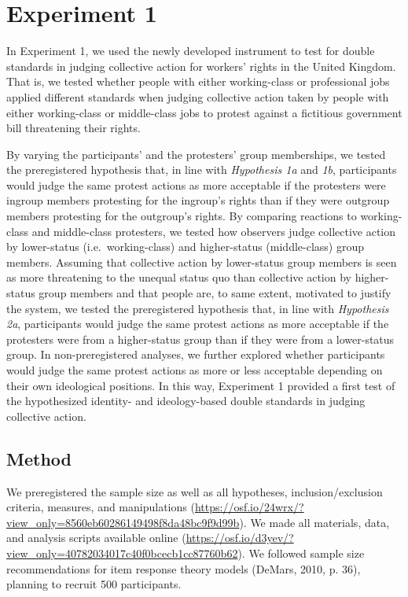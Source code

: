 \documentclass[twocolumn, 11pt, letterpaper]{article}
\begin{document}
\hypertarget{experiment-1}{%
\section{Experiment 1}\label{experiment-1}}

In Experiment 1, we used the newly developed instrument to test for
double standards in judging collective action for workers' rights in the
United Kingdom. That is, we tested whether people with either
working-class or professional jobs applied different standards when
judging collective action taken by people with either working-class or
middle-class jobs to protest against a fictitious government bill
threatening their rights.

By varying the participants' and the protesters' group memberships, we
tested the preregistered hypothesis that, in line with \emph{Hypothesis
1a} and \emph{1b}, participants would judge the same protest actions as
more acceptable if the protesters were ingroup members protesting for
the ingroup's rights than if they were outgroup members protesting for
the outgroup's rights. By comparing reactions to working-class and
middle-class protesters, we tested how observers judge collective action
by lower-status (i.e.~working-class) and higher-status (middle-class)
group members. Assuming that collective action by lower-status group
members is seen as more threatening to the unequal status quo than
collective action by higher-status group members and that people are, to
same extent, motivated to justify the system, we tested the
preregistered hypothesis that, in line with \emph{Hypothesis 2a},
participants would judge the same protest actions as more acceptable if
the protesters were from a higher-status group than if they were from a
lower-status group. In non-preregistered analyses, we further explored
whether participants would judge the same protest actions as more or
less acceptable depending on their own ideological positions. In this
way, Experiment 1 provided a first test of the hypothesized identity-
and ideology-based double standards in judging collective action.

\hypertarget{method}{%
\subsection{Method}\label{method}}

We preregistered the sample size as well as all hypotheses,
inclusion/exclusion criteria, measures, and manipulations
(\url{https://osf.io/24wrx/?view_only=8560eb60286149498f8da48bc9f9d99b}).
We made all materials, data, and analysis scripts available online
(\url{https://osf.io/d3yev/?view_only=40782034017c40f0bcecb1cc87760b62}).
We followed sample size recommendations for item response theory models
(DeMars, 2010, p. 36), planning to recruit 500 participants.
\end{document}
